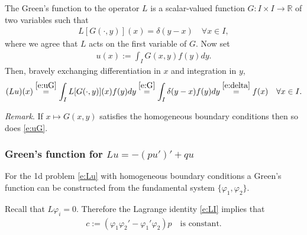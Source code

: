\documentclass[12pt,a4paper]{article}
\newcommand{\from}{\colon}
\newcommand{\IR}{\mathbb{R}}
\begin{document}
    
    The Green's function to the operator $L$ 
    is a scalar-valued function 
    $G \from I \times I \to \IR$
    of two variables
    such that
    \begin{align}
        \label{e:G}
        L [ G(\cdot, y) ](x)
        =
        \delta(y - x)
        \quad
        \forall x \in I
        ,
    \end{align}
    where we agree that $L$ acts on the first variable of $G$.
    Now set
    \begin{align}
        \label{e:uG}
        u(x) := \int_I G(x, y) f(y) dy
        .
    \end{align}
    Then, bravely exchanging differentiation in $x$ and integration in $y$,
    \begin{align}
        (L u)(x)
        \stackrel{\eqref{e:uG}}{=}
        \int_I L[ G(\cdot, y) ](x) f(y) dy
        \stackrel{\eqref{e:G}}{=}
        \int_I \delta(y - x) f(y) dy
        \stackrel{\eqref{e:delta}}{=}
        f(x)
        \quad
        \forall x \in I
        .
    \end{align}

    
    \emph{Remark}.
    If $x \mapsto G(x, y)$ satisfies
    the homogeneous boundary conditions
    then so does \eqref{e:uG}.
    
    
    \subsubsection*{Green's function for $L u = -(p u')' + q u$}
    
    For the 1d problem \eqref{e:Lu}
    with homogeneous boundary conditions
    a Green's function can be constructed
    from the fundamental system $\{ \varphi_1, \varphi_2 \}$.
    
    
    Recall that $L \varphi_i = 0$.
    Therefore
    the Lagrange identity \eqref{e:LI}
    implies that 
    \begin{align}
        \label{e:c}
        c := (\varphi_1 \varphi_2' - \varphi_1' \varphi_2) p
        \quad
        \text{is constant}.
    \end{align}
    
\end{document}
